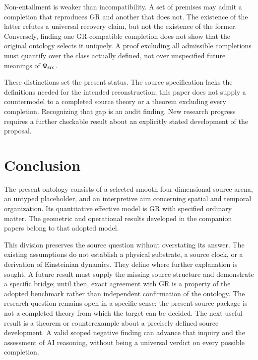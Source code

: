 \documentclass[11pt]{article}
\begin{document}
Non-entailment is weaker than incompatibility. A set of premises may admit a completion that reproduces GR and another that does not. The existence of the latter refutes a universal recovery claim, but not the existence of the former. Conversely, finding one GR-compatible completion does not show that the original ontology selects it uniquely. A proof excluding all admissible completions must quantify over the class actually defined, not over unspecified future meanings of $\Phi_{\mathrm{src}}$.

These distinctions set the present status. The source specification lacks the definitions needed for the intended reconstruction; this paper does not supply a countermodel to a completed source theory or a theorem excluding every completion. Recognizing that gap is an audit finding. New research progress requires a further checkable result about an explicitly stated development of the proposal.

\section{Conclusion}
The present ontology consists of a selected smooth four-dimensional source arena, an untyped \Aflow{} placeholder, and an interpretive aim concerning spatial and temporal organization. Its quantitative effective model is GR with specified ordinary matter. The geometric and operational results developed in the companion papers belong to that adopted model.

This division preserves the source question without overstating its answer. The existing assumptions do not establish a physical substrate, a source clock, or a derivation of Einsteinian dynamics. They define where further explanation is sought. A future result must supply the missing source structure and demonstrate a specific bridge; until then, exact agreement with GR is a property of the adopted benchmark rather than independent confirmation of the ontology.
The research question remains open in a specific sense: the present source package is not a completed theory from which the target can be decided. The next useful result is a theorem or counterexample about a precisely defined source development. A valid scoped negative finding can advance that inquiry and the assessment of AI reasoning, without being a universal verdict on every possible completion.

\References
\end{document}
